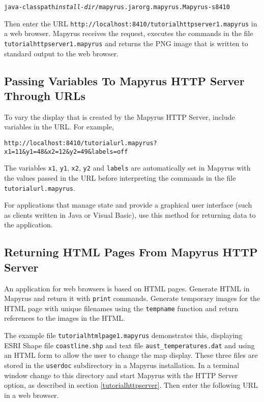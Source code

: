 \begin{alltt}
java -classpath \textit{install-dir}/mapyrus.jar org.mapyrus.Mapyrus -s 8410
\end{alltt}

Then enter the URL \texttt{http://localhost:8410/tutorialhttpserver1.mapyrus} in a
web browser.  Mapyrus receives the request, executes the commands in the file
\texttt{tutorialhttpserver1.mapyrus} and returns the PNG image that is written to
standard output to the web browser.

\subsection{Passing Variables To Mapyrus HTTP Server Through URLs}

To vary the display that is created by the Mapyrus HTTP Server, include
variables in the URL.  For example,

\begin{verbatim}
http://localhost:8410/tutorialurl.mapyrus?x1=11&y1=48&x2=12&y2=49&labels=off
\end{verbatim}

The variables \texttt{x1}, \texttt{y1}, \texttt{x2}, \texttt{y2}
and \texttt{labels} are automatically set in Mapyrus with the values
passed in the URL before interpreting
the commands in the file \texttt{tutorialurl.mapyrus}.

For applications that manage state
and provide a graphical user interface (such as clients written in
Java or Visual Basic), use this method for returning data to the
application.

\subsection{Returning HTML Pages From Mapyrus HTTP Server}

An application for web browsers is based on HTML pages.
Generate HTML in Mapyrus and return it with \texttt{print} commands.
Generate temporary images for the HTML page with
unique filenames using the
\texttt{tempname}
function and return references to the images in the HTML.

The example file \texttt{tutorialhtmlpage1.mapyrus} demonstrates
this, displaying ESRI Shape file
\texttt{coastline.shp}
and text file
\texttt{aust\_temperatures.dat}
and using an HTML form to allow
the user to change the map display.
These three files are stored in the \texttt{userdoc} subdirectory
in a Mapyrus installation.
In a terminal window change to this directory and
start Mapyrus with the HTTP Server option, as described in section
\ref{tutorialhttpserver}.
Then enter the following URL in a web browser.

